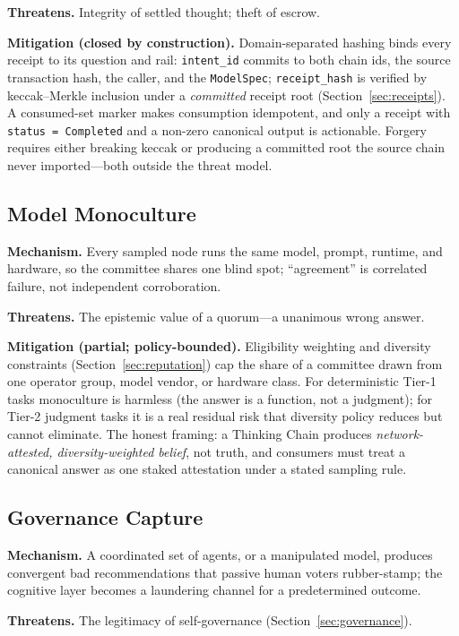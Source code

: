 \textbf{Threatens.} Integrity of settled thought; theft of escrow.

\textbf{Mitigation (closed by construction).} Domain-separated hashing binds every receipt to its question and rail: \texttt{intent\_id} commits to both chain ids, the source transaction hash, the caller, and the \texttt{ModelSpec}; \texttt{receipt\_hash} is verified by keccak--Merkle inclusion under a \emph{committed} receipt root (Section~\ref{sec:receipts}). A consumed-set marker makes consumption idempotent, and only a receipt with \texttt{status = Completed} and a non-zero canonical output is actionable. Forgery requires either breaking keccak or producing a committed root the source chain never imported---both outside the threat model.

\subsection{Model Monoculture}

\textbf{Mechanism.} Every sampled node runs the same model, prompt, runtime, and hardware, so the committee shares one blind spot; ``agreement'' is correlated failure, not independent corroboration.

\textbf{Threatens.} The epistemic value of a quorum---a unanimous wrong answer.

\textbf{Mitigation (partial; policy-bounded).} Eligibility weighting and diversity constraints (Section~\ref{sec:reputation}) cap the share of a committee drawn from one operator group, model vendor, or hardware class. For deterministic Tier-1 tasks monoculture is harmless (the answer is a function, not a judgment); for Tier-2 judgment tasks it is a real residual risk that diversity policy reduces but cannot eliminate. The honest framing: a Thinking Chain produces \emph{network-attested, diversity-weighted belief}, not truth, and consumers must treat a canonical answer as one staked attestation under a stated sampling rule.

\subsection{Governance Capture}

\textbf{Mechanism.} A coordinated set of agents, or a manipulated model, produces convergent bad recommendations that passive human voters rubber-stamp; the cognitive layer becomes a laundering channel for a predetermined outcome.

\textbf{Threatens.} The legitimacy of self-governance (Section~\ref{sec:governance}).

